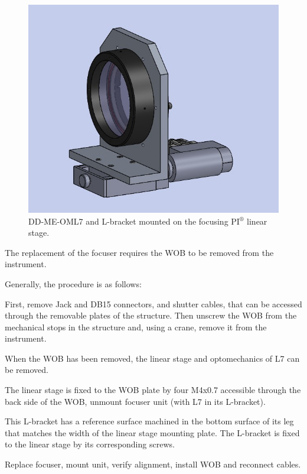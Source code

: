 \documentclass{report}
\begin{document}
\begin{figure}
\begin{center}
\includegraphics[width=0.7\linewidth]{figures/DD-OML7_LBr-LS.jpg}
\end{center}
\caption{DD-ME-OML7 and L-bracket mounted on the focusing PI${}^\circledR$ linear stage.}
\label{figure:WOB-OML7-LS}
\end{figure}

The replacement of the focuser requires the WOB to be removed from the instrument.

Generally, the procedure is as follows:

First, remove Jack and DB15 connectors, and shutter cables, that can be accessed through the removable plates of the structure. Then unscrew the WOB from the mechanical stops in the structure and, using a crane, remove it from the instrument.

When the WOB has been removed, the linear stage and optomechanics of L7 can be removed.

The linear stage is fixed to the WOB plate by four M4x0.7 accessible through the back side of the WOB, unmount focuser unit (with L7 in its L-bracket).

This L-bracket has a reference surface machined in the bottom surface of its leg that matches the width of the linear stage mounting plate. The L-bracket is fixed to the linear stage by its corresponding screws.

Replace focuser, mount unit, verify alignment, install WOB and reconnect cables.
\end{document}
